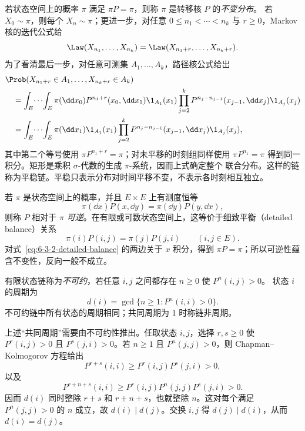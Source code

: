 \begin{definition}[不变分布与平稳链]\label{def:6-3-2-1}
若状态空间上的概率 $\pi$ 满足 $\pi P=\pi$，则称 $\pi$ 是转移核 $P$ 的\emph{不变分布}。
若 $X_0\sim\pi$，则每个 $X_n\sim\pi$；更进一步，对任意
$0\leq n_1<\cdots<n_k$ 与 $r\geq0$，Markov 核的迭代公式给
\[
 \Law(X_{n_1},\ldots,X_{n_k})
 =\Law(X_{n_1+r},\ldots,X_{n_k+r}).
\]
为了看清最后一步，对任意可测集 $A_1,\ldots,A_k$，路径核公式给出
\begin{align*}
 &\Prob(X_{n_1+r}\in A_1,\ldots,X_{n_k+r}\in A_k)\\
 &\quad=\int_E\!\cdots\!\int_E\pi(\dd x_0)
   P^{n_1+r}(x_0,\dd x_1)\1_{A_1}(x_1)
   \prod_{j=2}^k P^{n_j-n_{j-1}}(x_{j-1},\dd x_j)\1_{A_j}(x_j)\\
 &\quad=\int_E\!\cdots\!\int_E\pi(\dd x_1)\1_{A_1}(x_1)
   \prod_{j=2}^k P^{n_j-n_{j-1}}(x_{j-1},\dd x_j)\1_{A_j}(x_j),
\end{align*}
其中第二个等号使用 $\pi P^{n_1+r}=\pi$；对未平移的时刻组同样使用
$\pi P^{n_1}=\pi$ 得到同一积分。矩形是乘积 $\sigma$-代数的生成 $\pi$-系统，因而上式确定整个
联合分布。这样的链称为平稳链。平稳只表示分布对时间平移不变，不表示各时刻相互独立。
\end{definition}

\begin{definition}[可逆性]\label{def:6-3-2-2}
若 $\pi$ 是状态空间上的概率，并且 $E\times E$ 上有测度恒等
\begin{equation}\label{eq:6-3-2-detailed-balance}
 \pi(\dd x)P(x,\dd y)=\pi(\dd y)P(y,\dd x),
\end{equation}
则称 $P$ 相对于 $\pi$ \emph{可逆}。在有限或可数状态空间上，这等价于细致平衡（detailed balance）关系
\[
 \pi(i)P(i,j)=\pi(j)P(j,i)\qquad(i,j\in E).
\]
对式~\eqref{eq:6-3-2-detailed-balance} 的两边关于 $x$ 积分，得到
$\pi P=\pi$；所以可逆性蕴含不变性，反向一般不成立。
\end{definition}

\begin{definition}[不可约与周期]\label{def:6-3-2-3}
有限状态链称为\emph{不可约}，若任意 $i,j$ 之间都存在 $n\geq0$ 使 $P^n(i,j)>0$。
状态 $i$ 的周期为
\[
 d(i)=\gcd\{n\geq1:P^n(i,i)>0\}.
\]
不可约链中所有状态的周期相同；共同周期为 $1$ 时称链非周期。
\end{definition}

上述“共同周期”需要由不可约性推出。任取状态 $i,j$，选择
$r,s\ge0$ 使 $P^r(i,j)>0$ 且 $P^s(j,i)>0$。若 $n\ge1$ 且 $P^n(j,j)>0$，则
Chapman--Kolmogorov 方程给出
\[
 P^{r+s}(i,i)\ge P^r(i,j)P^s(j,i)>0,
\]
以及
\[
 P^{r+n+s}(i,i)
 \ge P^r(i,j)P^n(j,j)P^s(j,i)>0.
\]
因而 $d(i)$ 同时整除 $r+s$ 和 $r+n+s$，也就整除 $n$。这对每个满足
$P^n(j,j)>0$ 的 $n$ 成立，故 $d(i)\mid d(j)$。交换 $i,j$ 得
$d(j)\mid d(i)$，从而 $d(i)=d(j)$。

